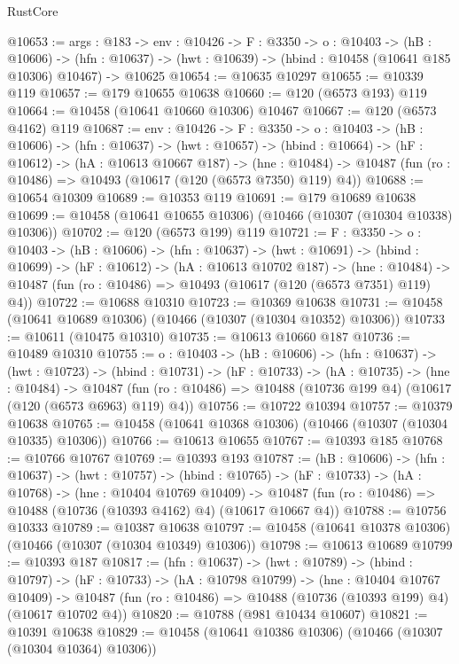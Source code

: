 \begin{lexlean}{RustCore}
\begin{coremodule}
@10653 := {args : @183} ->
  {env : @10426} ->
  {F : @3350} ->
  {o : @10403} ->
  (hB : @10606) ->
  (hfn : @10637) -> (hwt : @10639) -> (hbind : @10458 (@10641 @185 @10306) @10467) -> @10625
@10654 := @10635 @10297
@10655 := @10339 @119
@10657 := @179 @10655 @10638
@10660 := @120 (@6573 @193) @119
@10664 := @10458 (@10641 @10660 @10306) @10467
@10667 := @120 (@6573 @4162) @119
@10687 := {env : @10426} ->
  {F : @3350} ->
  {o : @10403} ->
  (hB : @10606) ->
  (hfn : @10637) ->
  (hwt : @10657) ->
  (hbind : @10664) ->
  (hF : @10612) ->
  (hA : @10613 @10667 @187) ->
  (hne : @10484) -> @10487 (fun (ro : @10486) => @10493 (@10617 (@120 (@6573 @7350) @119) @4))
@10688 := @10654 @10309
@10689 := @10353 @119
@10691 := @179 @10689 @10638
@10699 := @10458 (@10641 @10655 @10306) (@10466 (@10307 (@10304 @10338) @10306))
@10702 := @120 (@6573 @199) @119
@10721 := {F : @3350} ->
  {o : @10403} ->
  (hB : @10606) ->
  (hfn : @10637) ->
  (hwt : @10691) ->
  (hbind : @10699) ->
  (hF : @10612) ->
  (hA : @10613 @10702 @187) ->
  (hne : @10484) -> @10487 (fun (ro : @10486) => @10493 (@10617 (@120 (@6573 @7351) @119) @4))
@10722 := @10688 @10310
@10723 := @10369 @10638
@10731 := @10458 (@10641 @10689 @10306) (@10466 (@10307 (@10304 @10352) @10306))
@10733 := @10611 (@10475 @10310)
@10735 := @10613 @10660 @187
@10736 := @10489 @10310
@10755 := {o : @10403} ->
  (hB : @10606) ->
  (hfn : @10637) ->
  (hwt : @10723) ->
  (hbind : @10731) ->
  (hF : @10733) ->
  (hA : @10735) ->
  (hne : @10484) ->
  @10487 (fun (ro : @10486) => @10488 (@10736 @199 @4) (@10617 (@120 (@6573 @6963) @119) @4))
@10756 := @10722 @10394
@10757 := @10379 @10638
@10765 := @10458 (@10641 @10368 @10306) (@10466 (@10307 (@10304 @10335) @10306))
@10766 := @10613 @10655
@10767 := @10393 @185
@10768 := @10766 @10767
@10769 := @10393 @193
@10787 := (hB : @10606) ->
  (hfn : @10637) ->
  (hwt : @10757) ->
  (hbind : @10765) ->
  (hF : @10733) ->
  (hA : @10768) ->
  (hne : @10404 @10769 @10409) ->
  @10487 (fun (ro : @10486) => @10488 (@10736 (@10393 @4162) @4) (@10617 @10667 @4))
@10788 := @10756 @10333
@10789 := @10387 @10638
@10797 := @10458 (@10641 @10378 @10306) (@10466 (@10307 (@10304 @10349) @10306))
@10798 := @10613 @10689
@10799 := @10393 @187
@10817 := (hfn : @10637) ->
  (hwt : @10789) ->
  (hbind : @10797) ->
  (hF : @10733) ->
  (hA : @10798 @10799) ->
  (hne : @10404 @10767 @10409) ->
  @10487 (fun (ro : @10486) => @10488 (@10736 (@10393 @199) @4) (@10617 @10702 @4))
@10820 := @10788 (@981 @10434 @10607)
@10821 := @10391 @10638
@10829 := @10458 (@10641 @10386 @10306) (@10466 (@10307 (@10304 @10364) @10306))

\end{coremodule}
\end{lexlean}
